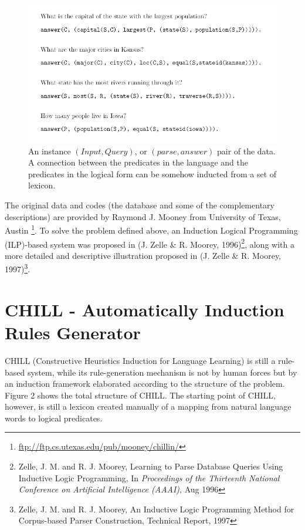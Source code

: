 \documentclass[11pt,a4paper]{article}
\begin{document}
\begin{figure}[ht]
\vskip 0.2in
\label{fig1}
\begin{center}
\centerline{\includegraphics[width=\columnwidth]{fig1}}
\caption{An instance $(Input,Query)$, or $(parse,answer)$ pair of the data. A connection between the predicates in the language and the predicates in the logical form can be somehow inducted from a set of lexicon.}
\end{center}
\vskip -0.2in
\end{figure}

The original data and codes (the database and some of the complementary descriptions) are provided by Raymond J. Mooney from University of Texas, Austin \footnote{\url{ftp://ftp.cs.utexas.edu/pub/mooney/chillin/}}. To solve the problem defined above, an Induction Logical Programming (ILP)-based system was proposed in (J. Zelle \& R. Moorey, 1996)\footnote{Zelle, J. M. and R. J. Moorey, Learning to Parse Database Queries Using Inductive Logic Programming, In \textit{Proceedings of the Thirteenth National Conference on Artificial Intelligence (AAAI)}, Aug 1996}, along with a more detailed and descriptive illustration proposed in (J. Zelle \& R. Moorey, 1997)\footnote{Zelle, J. M. and R. J. Moorey, An Inductive Logic Programming Method for Corpus-based Parser Construction, Technical Report, 1997}.

\section{CHILL - Automatically Induction Rules Generator}

CHILL (Constructive Heuristics Induction for Language Learning) is still a rule-based system, while its rule-generation mechanism is not by human forces but by an induction framework elaborated according to the structure of the problem. Figure 2 shows the total structure of CHILL. The starting point of CHILL, however, is still a lexicon created manually of a mapping from natural language words to logical predicates.
\end{document}
